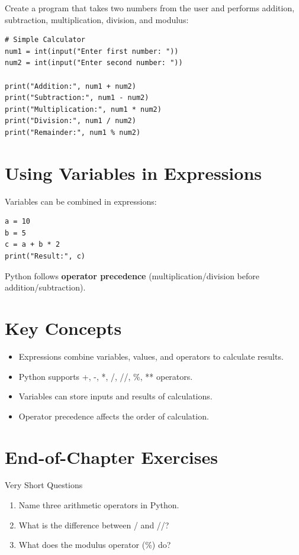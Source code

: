 Create a program that takes two numbers from the user and performs addition, subtraction, multiplication, division, and modulus:

\begin{verbatim}
# Simple Calculator
num1 = int(input("Enter first number: "))
num2 = int(input("Enter second number: "))

print("Addition:", num1 + num2)
print("Subtraction:", num1 - num2)
print("Multiplication:", num1 * num2)
print("Division:", num1 / num2)
print("Remainder:", num1 % num2)
\end{verbatim}

\section{Using Variables in Expressions}

Variables can be combined in expressions:

\begin{verbatim}
a = 10
b = 5
c = a + b * 2
print("Result:", c)
\end{verbatim}

Python follows \textbf{operator precedence} (multiplication/division before addition/subtraction).

\section{Key Concepts}

\begin{itemize}
    \item Expressions combine variables, values, and operators to calculate results.
    \item Python supports +, -, *, /, //, \%, ** operators.
    \item Variables can store inputs and results of calculations.
    \item Operator precedence affects the order of calculation.
\end{itemize}

\section{End-of-Chapter Exercises}

\begin{exercise}{Very Short Questions}
\begin{enumerate}
    \item Name three arithmetic operators in Python.
    \item What is the difference between / and //?
    \item What does the modulus operator (\%) do?
\end{enumerate}
\end{exercise}


